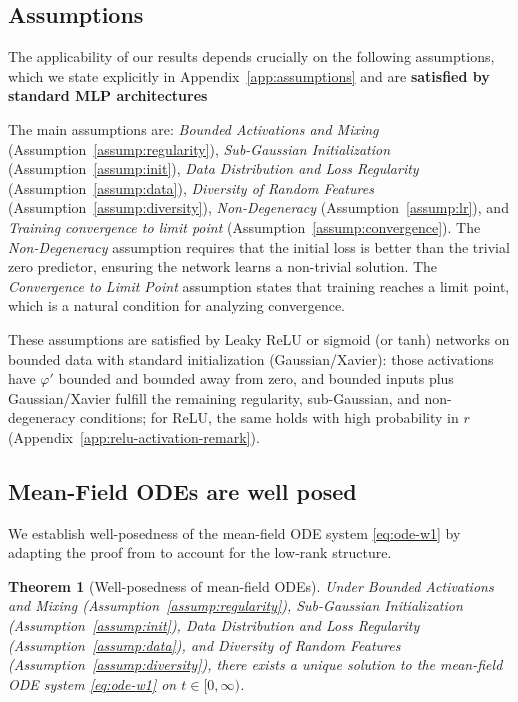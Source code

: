 \documentclass[nohyperref]{article}
\theoremstyle{plain}
\newtheorem{theorem}{Theorem}[section]
\theoremstyle{definition}
\theoremstyle{remark}
\begin{document}
\subsection{Assumptions}
\label{sec:assumptions}

The applicability of our results depends crucially on the following assumptions, which we state explicitly in Appendix~\ref{app:assumptions} and are \textbf{satisfied by standard MLP architectures}

The main assumptions are: \emph{Bounded Activations and Mixing} (Assumption~\ref{assump:regularity}), \emph{Sub-Gaussian Initialization} (Assumption~\ref{assump:init}), \emph{Data Distribution and Loss Regularity} (Assumption~\ref{assump:data}), \emph{Diversity of Random Features} (Assumption~\ref{assump:diversity}), \emph{Non-Degeneracy} (Assumption~\ref{assump:lr}), and \emph{Training convergence to limit point} (Assumption~\ref{assump:convergence}). The \emph{Non-Degeneracy} assumption requires that the initial loss is better than the trivial zero predictor, ensuring the network learns a non-trivial solution. The \emph{Convergence to Limit Point} assumption states that training reaches a limit point, which is a natural condition for analyzing convergence.

These assumptions are satisfied by Leaky ReLU or sigmoid (or tanh) networks on bounded data with standard initialization (Gaussian/Xavier): those activations have $\varphi'$ bounded and bounded away from zero, and bounded inputs plus Gaussian/Xavier fulfill the remaining regularity, sub-Gaussian, and non-degeneracy conditions; for ReLU, the same holds with high probability in $r$ (Appendix~\ref{app:relu-activation-remark}).















\subsection{Mean-Field ODEs are well posed}
\label{sec:wellposed}

We establish well-posedness of the mean-field ODE system \eqref{eq:ode-w1} by adapting the proof from \cite{nguyen2023rigorousframeworkmeanfield} to account for the low-rank structure.

\begin{theorem}[Well-posedness of mean-field ODEs]
\label{thm:wellposed}
Under \emph{Bounded Activations and Mixing} (Assumption~\ref{assump:regularity}), \emph{Sub-Gaussian Initialization} (Assumption~\ref{assump:init}), \emph{Data Distribution and Loss Regularity} (Assumption~\ref{assump:data}), and \emph{Diversity of Random Features} (Assumption~\ref{assump:diversity}), there exists a unique solution to the mean-field ODE system \eqref{eq:ode-w1} on $t\in[0,\infty)$.
\end{theorem}
\end{document}
